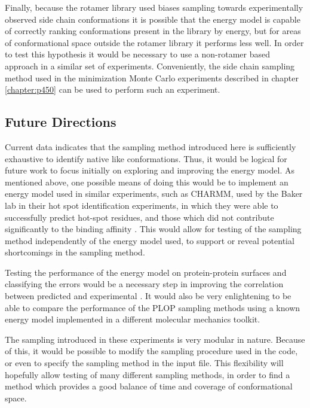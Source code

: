 Finally, because the rotamer library used biases sampling towards experimentally observed side chain conformations it is possible that the energy model is capable of correctly ranking conformations present in the library by energy, but for areas of conformational space outside the rotamer library it performs less well.
In order to test this hypothesis it would be necessary to use a non-rotamer based approach in a similar set of experiments.
Conveniently, the side chain sampling method used in the minimization Monte Carlo experiments described in chapter \ref{chapter:p450} can be used to perform such an experiment.

\subsection{Future Directions}
Current data indicates that the sampling method introduced here is sufficiently exhaustive to identify native like conformations.
Thus, it would be logical for future work to focus initially on exploring and improving the energy model.
As mentioned above, one possible means of doing this would be to implement an energy model used in similar experiments, such as CHARMM, used by the Baker lab in their hot spot identification experiments, in which they were able to successfully predict hot-spot residues, and those which did not contribute significantly to the binding affinity \cite{kortemme2004computational,lazaridis1999effective}.
This would allow for testing of the sampling method independently of the energy model used, to support or reveal potential shortcomings in the sampling method.

Testing the performance of the energy model on protein-protein surfaces and classifying the errors would be a necessary step in improving the correlation between predicted and experimental \ddg.
It would also be very enlightening to be able to compare the performance of the PLOP sampling methods using a known energy model implemented in a different molecular mechanics toolkit.

The sampling introduced in these experiments is very modular in nature.
Because of this, it would be possible to modify the sampling procedure used in the code, or even to specify the sampling method in the input file.
This flexibility will hopefully allow testing of many different sampling methods, in order to find a method which provides a good balance of time and coverage of conformational space.

